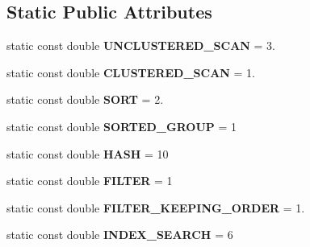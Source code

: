 \subsection*{Static Public Attributes}
\begin{DoxyCompactItemize}
\item 
\hypertarget{class_time_complexity_a271a2e8ae589bd80b438ab11908cad02}{static const double {\bfseries U\+N\+C\+L\+U\+S\+T\+E\+R\+E\+D\+\_\+\+S\+C\+A\+N} = 3.}\label{class_time_complexity_a271a2e8ae589bd80b438ab11908cad02}

\item 
\hypertarget{class_time_complexity_a5d917c41e7784cc85a29650ea9e54db2}{static const double {\bfseries C\+L\+U\+S\+T\+E\+R\+E\+D\+\_\+\+S\+C\+A\+N} = 1.}\label{class_time_complexity_a5d917c41e7784cc85a29650ea9e54db2}

\item 
\hypertarget{class_time_complexity_ab8e878b2dcc5d2943614849a27e4edbb}{static const double {\bfseries S\+O\+R\+T} = 2.}\label{class_time_complexity_ab8e878b2dcc5d2943614849a27e4edbb}

\item 
\hypertarget{class_time_complexity_ad2ed168a66bfcbd9f5831360e4d6437a}{static const double {\bfseries S\+O\+R\+T\+E\+D\+\_\+\+G\+R\+O\+U\+P} = 1}\label{class_time_complexity_ad2ed168a66bfcbd9f5831360e4d6437a}

\item 
\hypertarget{class_time_complexity_a052631ae60c26ad4f0d840f012193898}{static const double {\bfseries H\+A\+S\+H} = 10}\label{class_time_complexity_a052631ae60c26ad4f0d840f012193898}

\item 
\hypertarget{class_time_complexity_a4a30ee8b7f0778df1564a9c0baa259bd}{static const double {\bfseries F\+I\+L\+T\+E\+R} = 1}\label{class_time_complexity_a4a30ee8b7f0778df1564a9c0baa259bd}

\item 
\hypertarget{class_time_complexity_a31c8e9e4ede24384d6dfc199d7dd1df6}{static const double {\bfseries F\+I\+L\+T\+E\+R\+\_\+\+K\+E\+E\+P\+I\+N\+G\+\_\+\+O\+R\+D\+E\+R} = 1.}\label{class_time_complexity_a31c8e9e4ede24384d6dfc199d7dd1df6}

\item 
\hypertarget{class_time_complexity_ae8697720bb5788db90670f511073a606}{static const double {\bfseries I\+N\+D\+E\+X\+\_\+\+S\+E\+A\+R\+C\+H} = 6}\label{class_time_complexity_ae8697720bb5788db90670f511073a606}


\end{DoxyCompactItemize}
